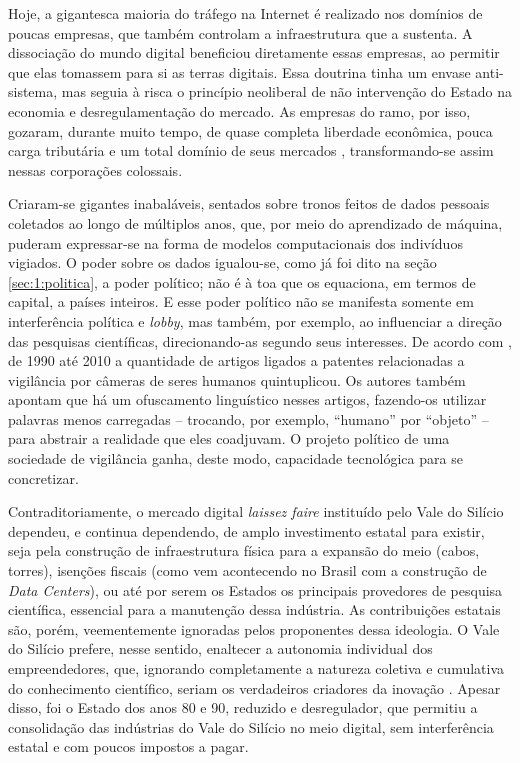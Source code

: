 Hoje, a gigantesca maioria do tráfego na Internet é realizado nos domínios de poucas empresas, que também controlam a infraestrutura que a sustenta.
A dissociação do mundo digital beneficiou diretamente essas empresas, ao permitir que elas tomassem para si as terras digitais.
Essa doutrina tinha um envase anti-sistema, mas seguia à risca o princípio neoliberal de não intervenção do Estado na economia e desregulamentação do mercado.
As empresas do ramo, por isso, gozaram, durante muito tempo, de quase completa liberdade econômica, pouca carga tributária e um total domínio de seus mercados \cite[p.~156]{morozov_big_2018}, transformando-se assim nessas corporações colossais.

Criaram-se gigantes inabaláveis, sentados sobre tronos feitos de dados pessoais coletados ao longo de múltiplos anos, que, por meio do aprendizado de máquina, puderam expressar-se na forma de modelos computacionais dos indivíduos vigiados.
O poder sobre os dados igualou-se, como já foi dito na seção \ref{sec:1:politica}, a poder político; não é à toa que \textcite{nunes_coase_2025} os equaciona, em termos de capital, a países inteiros.
E esse poder político não se manifesta somente em interferência política e \textit{lobby}, mas também, por exemplo, ao influenciar a direção das pesquisas científicas, direcionando-as segundo seus interesses.
De acordo com \textcite{kalluri_computervision_2025a}, de 1990 até 2010 a quantidade de artigos ligados a patentes relacionadas a vigilância por câmeras de seres humanos quintuplicou.
Os autores também apontam que há um ofuscamento linguístico nesses artigos, fazendo-os utilizar palavras menos carregadas -- trocando, por exemplo, ``humano'' por ``objeto'' -- para abstrair a realidade que eles coadjuvam. 
O projeto político de uma sociedade de vigilância ganha, deste modo, capacidade tecnológica para se concretizar. 

Contraditoriamente, o mercado digital \textit{laissez faire} instituído pelo Vale do Silício dependeu, e continua dependendo, de amplo investimento estatal para existir, seja pela construção de infraestrutura física para a expansão do meio (cabos, torres), isenções fiscais (como vem acontecendo no Brasil com a construção de \textit{Data Centers}), ou até por serem os Estados os principais provedores de pesquisa científica, essencial para a manutenção dessa indústria.
As contribuições estatais são, porém, veementemente ignoradas pelos proponentes dessa ideologia.
O Vale do Silício prefere, nesse sentido, enaltecer a autonomia individual dos empreendedores, que, ignorando completamente a natureza coletiva e cumulativa do conhecimento científico, seriam os verdadeiros criadores da inovação \cite{barbrook_ideologia_2018}.
Apesar disso, foi o Estado dos anos 80 e 90, reduzido e desregulador, que permitiu a consolidação das indústrias do Vale do Silício no meio digital, sem interferência estatal e com poucos impostos a pagar.

